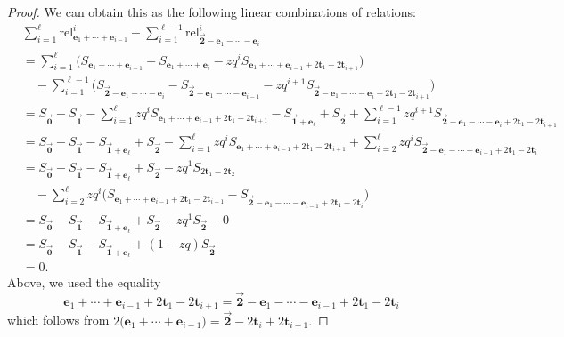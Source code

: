 \documentclass[pdftex]{sigma}
\numberwithin{equation}{section}
\theoremstyle{definition}
\newcommand{\rel}{\text{rel}}
\newcommand{\tr}{\mathbf{t}}
\newcommand{\ee}{\mathbf{e}}
\newcommand{\two}{\vec{\mathbf{2}}}
\newcommand{\one}{\vec{\mathbf{1}}}
\newcommand{\zero}{\vec{\mathbf{0}}}
\begin{document}
\begin{proof}
We can obtain this as the following linear combinations of relations:
\begin{align*}
&\sum_{i=1}^\ell \rel^i_{\ee_1+\cdots+\ee_{i-1}} - \sum_{i=1}^{\ell-1}\rel^i_{\two-\ee_1-\cdots-\ee_i} \\
&=\sum_{i=1}^\ell \bigl(
S_{\ee_1+\cdots+\ee_{i-1}} - S_{\ee_1+\cdots+\ee_i} - zq^{i} S_{\ee_1+\cdots+\ee_{i-1}+2\tr_1-2\tr_{i+1}}\bigr) \\
&\quad- \sum_{i=1}^{\ell-1}\bigl(
S_{\two-\ee_1-\cdots-\ee_i} - S_{\two-\ee_1-\cdots-\ee_{i-1}} - zq^{i+1} S_{\two-\ee_1-\cdots-\ee_i+2\tr_1-2\tr_{i+1}}\bigr) \\
&=S_{\zero} - S_{\one} - \sum_{i=1}^\ell zq^{i} S_{\ee_1+\cdots+\ee_{i-1}+2\tr_1-2\tr_{i+1}} -
S_{\one+\ee_\ell} + S_{\two} + \sum_{i=1}^{\ell-1}zq^{i+1} S_{\two-\ee_1-\cdots-\ee_i+2\tr_1-2\tr_{i+1}} \\
&= S_{\zero} - S_{\one} -
S_{\one+\ee_\ell} + S_{\two} - \sum_{i=1}^\ell zq^{i} S_{\ee_1+\cdots+\ee_{i-1}+2\tr_1-2\tr_{i+1}} + \sum_{i=2}^{\ell}zq^{i} S_{\two-\ee_1-\cdots-\ee_{i-1}+2\tr_1-2\tr_{i}} \\
&= S_{\zero} - S_{\one} -
S_{\one+\ee_\ell} + S_{\two} -
 zq^{1} S_{2\tr_1-2\tr_{2}} \\
&\quad-\sum_{i=2}^\ell zq^{i} \bigl(S_{\ee_1+\cdots+\ee_{i-1}+2\tr_1-2\tr_{i+1}} -S_{\two-\ee_1-\cdots-\ee_{i-1}+2\tr_1-2\tr_{i}}\bigr) \\
&= S_{\zero} - S_{\one} -
S_{\one+\ee_\ell} + S_{\two} -
 zq^{1} S_{\two} -0 \\
&= S_{\zero} - S_{\one} - S_{\one+\ee_\ell} + (1-zq)S_{\two} \\
&= 0.
\end{align*}
Above, we used the equality
\begin{equation*}
\ee_1+\cdots+\ee_{i-1}+2\tr_1-2\tr_{i+1}={\two-\ee_1-\cdots-\ee_{i-1}+2\tr_1-2\tr_{i}}
\end{equation*} which follows from $
2\bigl(\ee_1+\cdots+\ee_{i-1}\bigr)=\two-2\tr_{i}+2\tr_{i+1}.$
\end{proof}
\end{document}
